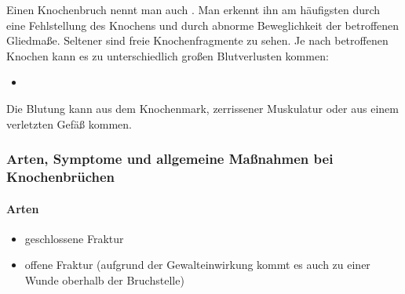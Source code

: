 Einen Knochenbruch nennt man auch . Man erkennt ihn am  häufigsten
durch eine Fehlstellung des Knochens und durch abnorme Beweglichkeit  der
betroffenen Gliedmaße. Seltener sind freie Knochenfragmente zu sehen.  Je nach
betroffenen Knochen kann es zu unterschiedlich großen Blutverlusten kommen:
\begin{itemize}
  \item {}
\end{itemize}
Die Blutung kann aus dem Knochenmark, zerrissener Muskulatur oder aus einem 
verletzten Gefäß kommen.

\subsubsection{Arten, Symptome und allgemeine Maßnahmen bei Knochenbrüchen}

\paragraph{Arten}
\begin{itemize}
  \item geschlossene Fraktur
  \item offene Fraktur (aufgrund der Gewalteinwirkung kommt es auch zu  einer
  Wunde oberhalb der Bruchstelle)
\end{itemize}



